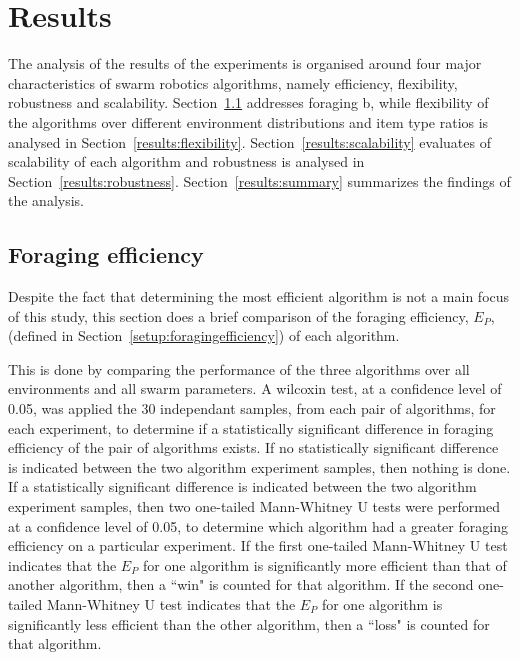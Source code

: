 \chapter{Results}
\label{chap:results}

The analysis of the results of the experiments is organised around four major characteristics of swarm robotics algorithms, namely efficiency, flexibility, robustness and scalability. Section~\ref{results:efficiency} addresses foraging b, while flexibility of the algorithms over different environment distributions and item type ratios is analysed in Section~\ref{results:flexibility}. Section~\ref{results:scalability} evaluates of scalability of each algorithm and robustness is analysed in Section~\ref{results:robustness}. Section~\ref{results:summary} summarizes the findings of the analysis.

\section{Foraging efficiency}
\label{results:efficiency}


Despite the fact that determining the most efficient algorithm is not a main focus of this study, this section does a brief comparison of the foraging efficiency, $E_P$, (defined in Section~\ref{setup:foragingefficiency}) of each algorithm. 

This is done by comparing the performance of the three algorithms over all environments and all swarm parameters. A wilcoxin test, at a confidence level of 0.05, was applied the 30 independant samples, from each pair of algorithms, for each experiment, to determine if a statistically significant difference in foraging efficiency of the pair of algorithms exists. If no statistically significant difference is indicated between the two algorithm experiment samples, then nothing is done. If a statistically significant difference is indicated between the two algorithm experiment samples, then two one-tailed Mann-Whitney U tests were performed at a confidence level of 0.05, to determine which algorithm had a greater foraging efficiency on a particular experiment. If the first one-tailed Mann-Whitney U test indicates that the $E_P$ for one algorithm is significantly more efficient than that of another algorithm, then a ``win" is counted for that algorithm. If the second one-tailed Mann-Whitney U test indicates that the $E_P$ for one algorithm is significantly less efficient than the other algorithm, then a ``loss" is counted for that algorithm. 

